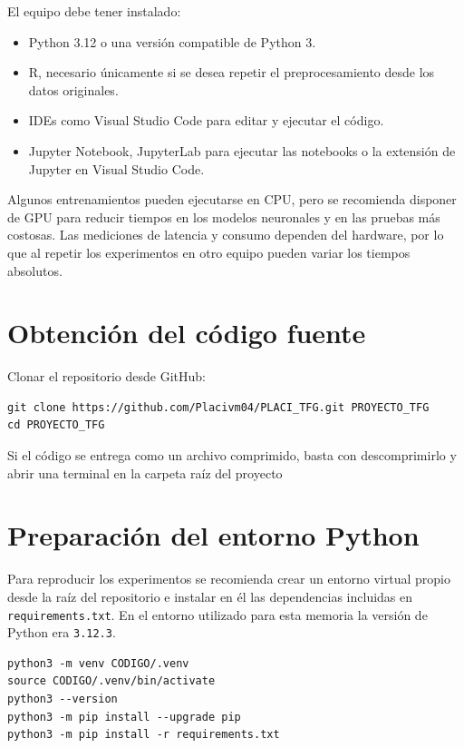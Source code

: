 El equipo debe tener instalado:

\begin{itemize}
    \item Python 3.12 o una versión compatible de Python 3.
    \item R, necesario únicamente si se desea repetir el preprocesamiento desde los datos originales.
    \item IDEs como Visual Studio Code para editar y ejecutar el código.
    \item Jupyter Notebook, JupyterLab para ejecutar las notebooks o la extensión de Jupyter en Visual Studio Code.
\end{itemize}

Algunos entrenamientos pueden ejecutarse en CPU, pero se recomienda disponer de GPU para reducir tiempos en los modelos neuronales y en las pruebas más costosas. Las mediciones de latencia y consumo dependen del hardware, por lo que al repetir los experimentos en otro equipo pueden variar los tiempos absolutos.

\section{Obtención del código fuente}

Clonar el repositorio desde GitHub:

\begin{verbatim}
git clone https://github.com/Placivm04/PLACI_TFG.git PROYECTO_TFG
cd PROYECTO_TFG
\end{verbatim}

Si el código se entrega como un archivo comprimido, basta con descomprimirlo y abrir una terminal en la carpeta raíz del proyecto

\section{Preparación del entorno Python}

Para reproducir los experimentos se recomienda crear un entorno virtual propio desde la raíz del repositorio e instalar en él las dependencias incluidas en \texttt{requirements.txt}. En el entorno utilizado para esta memoria la versión de Python era \texttt{3.12.3}.

\begin{verbatim}
python3 -m venv CODIGO/.venv
source CODIGO/.venv/bin/activate
python3 --version
python3 -m pip install --upgrade pip
python3 -m pip install -r requirements.txt
\end{verbatim}

